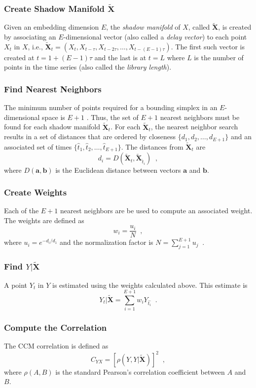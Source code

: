 \documentclass[twocolumn,aps,pre,groupedaddress]{revtex4-1}
\begin{document}
\subsubsection{Create Shadow Manifold $\tilde{\mathbf{X}}$}
\label{sec:shadow}
Given an embedding dimension $E$, the {\em shadow manifold} of $X$, called $\tilde{\mathbf{X}}$, is created by associating an $E$-dimensional vector (also called a {\em delay vector}) to each point $X_t$ in $X$, i.e., $\tilde{\mathbf{X}}_t=\left(X_t,X_{t-\tau},X_{t-2\tau},\ldots,X_{t-(E-1)\tau}\right)$.  The first such vector is created at $t=1+(E-1)\tau$ and the last is at $t=L$ where $L$ is the number of points in the time series (also called the {\em library length}).  

\subsubsection{Find Nearest Neighbors}
The minimum number of points required for a bounding simplex in an $E$-dimensional space is $E+1$ \cite{Sugihara1990,Sugihara1990a}.  Thus,  the set of $E+1$ nearest neighbors must be found for each shadow manifold $\tilde{\mathbf{X}}_t$.  For each $\tilde{\mathbf{X}}_t$, the nearest neighbor search results in a set of distances that are ordered by closeness $\{d_1,d_2,\ldots,d_{E+1}\}$ and an associated set of times $\{\hat{t}_1,\hat{t}_2,\ldots,\hat{t}_{E+1}\}$.  The distances from $\tilde{\mathbf{X}}_t$ are
$$
d_i = D\left(\tilde{\mathbf{X}}_t,\tilde{\mathbf{X}}_{\hat{t}_i}\right)\;\;,
$$
where $D(\mathbf{a},\mathbf{b})$ is the Euclidean distance between vectors $\mathbf{a}$ and $\mathbf{b}$.

\subsubsection{Create Weights}
Each of the $E+1$ nearest neighbors are be used to compute an associated weight.  The weights are defined as
$$
w_i = \frac{u_i}{N}\;\;,
$$
where
$u_i = e^{-d_i/d_1}$ and the normalization factor is $N = \sum_{j=1}^{E+1} u_j\;\;.$

\subsubsection{Find $Y|\tilde{\mathbf{X}}$}
A point $Y_t$ in $Y$ is estimated using the weights calculated above.  This estimate is
$$
Y_t|\tilde{\mathbf{X}} = \sum_{i=1}^{E+1} w_i Y_{\hat{t_i}}\;\;.
$$

\subsubsection{Compute the Correlation}
The CCM correlation is defined as 
$$
C_{YX} = \left[\rho\left(Y,Y|\tilde{\mathbf{X}}\right)\right]^2\;\;,
$$
where $\rho\left(A,B\right)$ is the standard Pearson's correlation coefficient between $A$ and $B$.  
\end{document}

